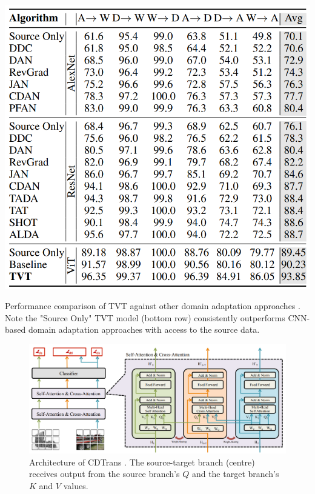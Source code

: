 \documentclass[a4paper,12pt]{report}
\begin{document}
    \begin{table}[t]
        \centering
        \includegraphics[scale=0.5]{res/vit-table.png}
        \caption{Performance comparison of TVT against other domain adaptation approaches \cite{yang_tvt_2021}. Note the "Source Only" TVT model (bottom row) consistently outperforms CNN-based domain adaptation approaches with access to the source data.}
        \label{tab:vit_table}
    \end{table}
    
   \begin{figure}[ht]
        \centering
        \includegraphics[width=\textwidth]{res/cdtrans-architecture.png}
        \caption{Architecture of CDTrans \cite{xu_cdtrans_2021}. The source-target branch (centre) receives output from the source branch's $Q$ and the target branch's $K$ and $V$ values.}
        \label{fig:cdtrans_architecture}
    \end{figure}
    
\end{document}
